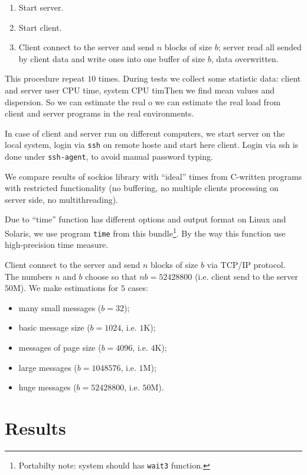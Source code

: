 \documentclass[a4paper]{article}
\begin{document}
\begin{enumerate}
  \item Start server.
  \item Start client.
  \item Client connect to the server and send $n$ blocks of size $b$;
        server read all sended by client data and write ones into one
        buffer of size $b$, data overwritten.
\end{enumerate}

This procedure repeat $10$ times. During tests we collect some statistic
data: client and server user CPU time, system CPU timThen we find mean values and dispersion. So we can estimate the real
o we can estimate the real
load from client and server programs in the real environments.

In case of client and server run on different computers, we start server on
the local system, login via \texttt{ssh} on remote hoste and start here client.
Login via ssh is done under \texttt{ssh-agent}, to avoid manual password typing.

We compare results of sockios library with ``ideal'' times from
C-written programs with restricted functionality (no buffering, no multiple
clients processing on server side, no multithreading).

Due to ``time'' function has different options and output format on Linux
and Solaris, we use program \texttt{time} from this
bundle\footnote{Portabilty note: system should has \texttt{wait3} function.}.
By the way this function use high-precision time measure.

Client connect to the server and send $n$ blocks of size $b$ via TCP/IP protocol.
The numbers $n$ and $b$ choose so that $n b = 52428800$ (i.e. client send
to the server $50$M). We make estimations for $5$ cases:
\begin{itemize}
  \item many small messages ($b = 32$);
  \item basic message size ($b = 1024$, i.e. $1$K);
  \item messages of page size ($b = 4096$, i.e. $4$K);
  \item large messages ($b = 1048576$, i.e. $1$M);
  \item huge messages ($b = 52428800$, i.e. $50$M).
\end{itemize}

\section{Results}
\end{document}
